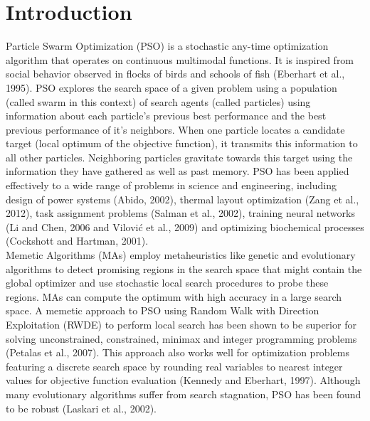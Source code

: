 \section{Introduction}

Particle Swarm Optimization (PSO) is a stochastic any-time optimization algorithm that operates on continuous multimodal functions. It is inspired from social behavior observed in flocks of birds and schools of fish (Eberhart et al., 1995). PSO explores the search space of a given problem using a population (called swarm in this context) of search agents (called particles) using information about each particle's previous best performance and the best previous performance of it's neighbors. When one particle locates a candidate target (local optimum of the objective function), it transmits this information to all other particles. Neighboring particles gravitate towards this target using the information they have gathered as well as past memory. PSO has been applied effectively to a wide range of problems in science and engineering, including design of power systems (Abido, 2002), thermal layout optimization (Zang et al., 2012), task assignment problems (Salman et al., 2002), training neural networks (Li and Chen, 2006 and Vilović et al., 2009) and optimizing biochemical processes (Cockshott and Hartman, 2001).\\

Memetic Algorithms (MAs) employ metaheuristics like genetic and evolutionary algorithms to detect promising regions in the search space that might contain the global optimizer and use stochastic local search procedures to probe these regions. MAs can compute the optimum with high accuracy in a large search space. A memetic approach to PSO using Random Walk with Direction Exploitation (RWDE) to perform local search has been shown to be superior for solving unconstrained, constrained, minimax and integer programming problems (Petalas et al., 2007). This approach also works well for optimization problems featuring a discrete search space by rounding real variables to nearest integer values for objective function evaluation (Kennedy and Eberhart, 1997). Although many evolutionary algorithms suffer from search stagnation, PSO has been found to be robust (Laskari et al., 2002).\\

